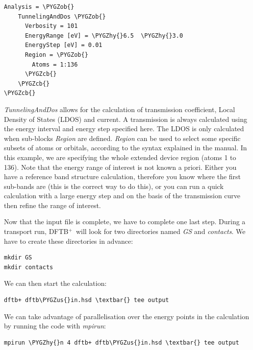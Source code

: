 \documentclass[a4paper,11pt,english]{sphinxmanual}
\newcommand{\dftbp}{\textsf{DFTB$^{\text{+}}$\ }} %
\def\PYGZus{\char`\_}
\def\PYGZob{\char`\{}
\def\PYGZcb{\char`\}}
\def\PYGZhy{\char`\-}
\begin{document}
{{\begin{Verbatim}[commandchars=\\\{\}]
Analysis = \PYGZob{}
    TunnelingAndDos \PYGZob{}
      Verbosity = 101
      EnergyRange [eV] = \PYGZhy{}6.5  \PYGZhy{}3.0
      EnergyStep [eV] = 0.01
      Region = \PYGZob{}
        Atoms = 1:136
      \PYGZcb{}
    \PYGZcb{}
\PYGZcb{}
\end{Verbatim}

\emph{TunnelingAndDos} allows for the calculation of transmission
coefficient, Local Density of States (LDOS) and current. A
transmission is always calculated using the energy interval and energy
step specified here. The LDOS is only calculated when sub-blocks
\emph{Region} are defined. \emph{Region} can be used to select some specific
subsets of atoms or orbitals, according to the syntax explained in the
manual. In this example, we are specifying the whole extended device
region (atoms 1 to 136). Note that the energy range of interest is not
known a priori. Either you have a reference band structure
calculation, therefore you know where the first sub-bands are (this is
the correct way to do this), or you can run a quick calculation with a
large energy step and on the basis of the transmission curve then
refine the range of interest.

Now that the input file is complete, we have to complete one last
step. During a transport run, \dftbp will look for two directories
named \emph{GS} and \emph{contacts}. We have to create these directories in
advance:

\begin{Verbatim}[commandchars=\\\{\}]
mkdir GS
mkdir contacts
\end{Verbatim}

We can then start the calculation:

\begin{Verbatim}[commandchars=\\\{\}]
dftb+ dftb\PYGZus{}in.hsd \textbar{} tee output
\end{Verbatim}

We can take advantage of parallelisation over the energy points in the
calculation by running the code with \emph{mpirun}:

\begin{Verbatim}[commandchars=\\\{\}]
mpirun \PYGZhy{}n 4 dftb+ dftb\PYGZus{}in.hsd \textbar{} tee output
\end{Verbatim}

}}
\end{document}
